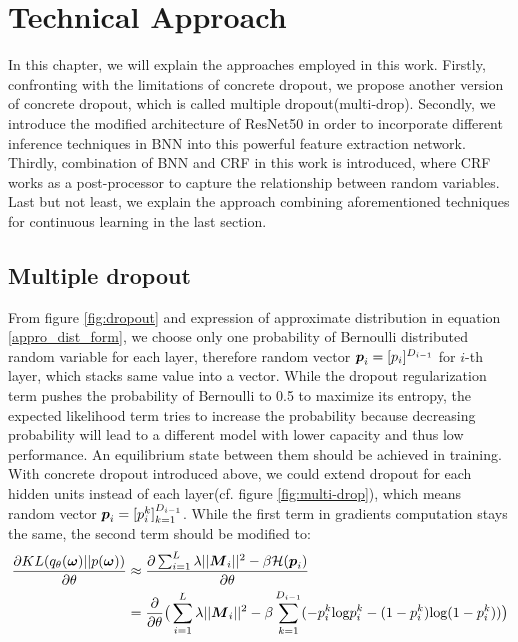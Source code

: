 \chapter{Technical Approach}
In this chapter, we will explain the approaches employed in this work. Firstly, confronting with the limitations of concrete dropout, we propose another version of concrete dropout, which is called multiple dropout(multi-drop). Secondly, we introduce the modified architecture of ResNet50 in order to incorporate different inference techniques in BNN into this powerful feature extraction network. Thirdly, combination of BNN and CRF in this work is introduced, where CRF works as a post-processor to capture the relationship between random variables. Last but not least, we explain the approach combining aforementioned techniques for continuous learning in the last section.

\section{Multiple dropout}
From figure \ref{fig:dropout} and expression of approximate distribution in equation \ref{appro_dist_form}, we choose only one probability of Bernoulli distributed random variable for each layer, therefore random vector $\boldsymbol p_i = [p_i]^{D_{i-1}}$ for $i$-th layer, which stacks same value into a vector. While the dropout regularization term pushes the probability of Bernoulli to 0.5 to maximize its entropy, the expected likelihood term tries to increase the probability because decreasing probability will lead to a different model with lower capacity and thus low performance. An equilibrium state between them should be achieved in training. With concrete dropout introduced above, we could extend dropout for each hidden units instead of each layer(cf. figure \ref{fig:multi-drop}), which means random vector $\boldsymbol p_i = [p_i^k]_{k=1}^{D_{i-1}}$. While the first term in gradients computation stays the same, the second term should be modified to:
\begin{equation} 
\begin{aligned}\label{KL_grad_multi}
\frac{\partial KL(q_{\theta}(\boldsymbol \omega)||p(\boldsymbol \omega))}{\partial \theta} 
&\approx \frac{\partial \sum_{i=1}^{L}\lambda||\boldsymbol M_{i}||^{2}- \beta \mathcal H(\boldsymbol p_{i})}{\partial \theta}  \\
&= \frac{\partial}{\partial \theta} \big( \sum_{i=1}^{L}\lambda||\boldsymbol M_{i}||^{2}- \beta \sum_{k=1}^{D_{i-1}}(-p_i^k\text{log}p_i^k - (1-p_i^k)\text{log}(1-p_i^k))\big)
\end{aligned}
\end{equation}  

